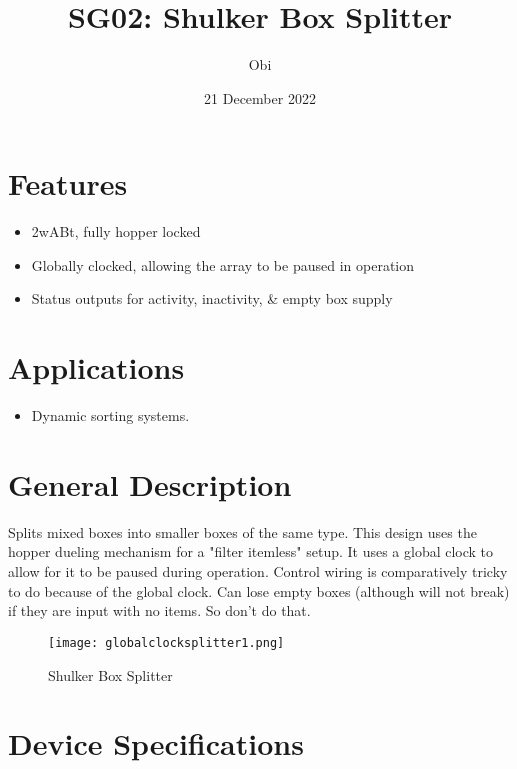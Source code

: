 \documentclass[10pt]{datasheet}
\title{SG02: Shulker Box Splitter}
\author{Obi}
\date{21 December 2022}
\begin{document}
\maketitle

\section{Features}

\begin{itemize}
\item{2wABt, fully hopper locked}
\item{Globally clocked, allowing the array to be paused in operation}
\item{Status outputs for activity, inactivity, \& empty box supply}
\end{itemize}

\section{Applications}

\begin{itemize}
\item{Dynamic sorting systems.}
\end{itemize}

\section{General Description}
Splits mixed boxes into smaller boxes of the same type. This design uses the hopper dueling mechanism for a "filter itemless" setup. It uses a global clock to allow for it to be paused during operation. Control wiring is comparatively tricky to do because of the global clock. Can lose empty boxes (although will not break) if they are input with no items. So don't do that. 

\vfill\break

\begin{figure}[h]
    \centering
    \texttt{[image: globalclocksplitter1.png]}
    \caption{\centering Shulker Box Splitter}
\end{figure}

\onecolumn

\section{Device Specifications}
\end{document}
